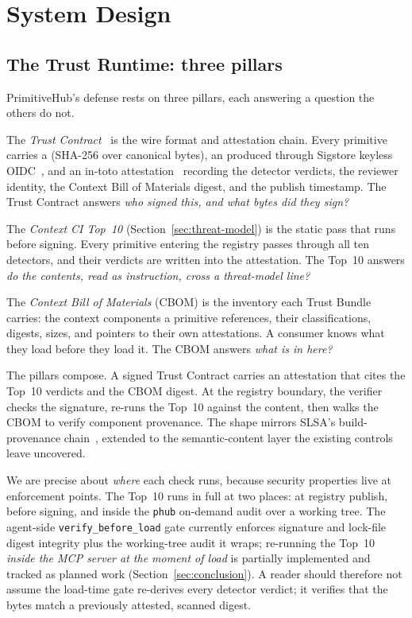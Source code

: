 
\section{System Design}
\label{sec:system-design}

\subsection{The Trust Runtime: three pillars}

PrimitiveHub's defense rests on three pillars, each answering a question
the others do not.

The \emph{Trust Contract}~\cite{primitivehub:2026:trust-contract} is the
wire format and attestation chain. Every primitive carries a
\contentdigest{} (SHA-256 over canonical bytes), an \edsig{} produced
through Sigstore keyless OIDC~\cite{Sigstore:2021:keyless-signing}, and
an in-toto attestation~\cite{in-toto:2016:supply-chain} recording the
detector verdicts, the reviewer identity, the Context Bill of Materials
digest, and the publish timestamp. The Trust Contract answers \emph{who
signed this, and what bytes did they sign?}

The \emph{Context CI Top~10} (Section~\ref{sec:threat-model}) is the
static pass that runs before signing. Every primitive entering the
registry passes through all ten detectors, and their verdicts are
written into the attestation. The Top~10 answers \emph{do the contents,
read as instruction, cross a threat-model line?}

The \emph{Context Bill of Materials} (CBOM) is the inventory each Trust
Bundle carries: the context components a primitive references, their
classifications, digests, sizes, and pointers to their own attestations.
A consumer knows what they load before they load it. The CBOM answers
\emph{what is in here?}

The pillars compose. A signed Trust Contract carries an attestation that
cites the Top~10 verdicts and the CBOM digest. At the registry boundary,
the verifier checks the signature, re-runs the Top~10 against the
content, then walks the CBOM to verify component provenance. The shape
mirrors SLSA's build-provenance chain~\cite{SLSA:2023:provenance-spec},
extended to the semantic-content layer the existing controls leave
uncovered.

We are precise about \emph{where} each check runs, because security
properties live at enforcement points. The Top~10 runs in full at two
places: at registry publish, before signing, and inside the
\texttt{phub} on-demand audit over a working tree. The agent-side
\texttt{verify\_before\_load} gate currently enforces signature and
lock-file digest integrity plus the working-tree audit it wraps;
re-running the Top~10 \emph{inside the MCP server at the moment of load}
is partially implemented and tracked as planned work
(Section~\ref{sec:conclusion}). A reader should therefore not assume the
load-time gate re-derives every detector verdict; it verifies that the
bytes match a previously attested, scanned digest.

